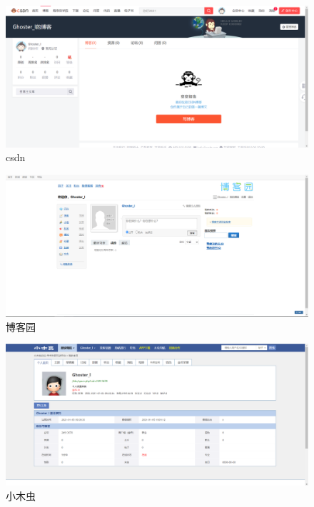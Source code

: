 \documentclass{article}
\begin{document}
	\begin{figure}[ht]
	\centering
	\includegraphics[scale=0.15]{csdn}
	\caption{csdn}
	\end{figure}
	\begin{figure}[ht]
		\centering
		\includegraphics[scale=0.15]{boke}
		\caption{博客园}
	\end{figure}
	\begin{figure}[ht]
		\centering
		\includegraphics[scale=0.15]{xiaomuchong}
		\caption{小木虫}
	\end{figure}
\end{document}

